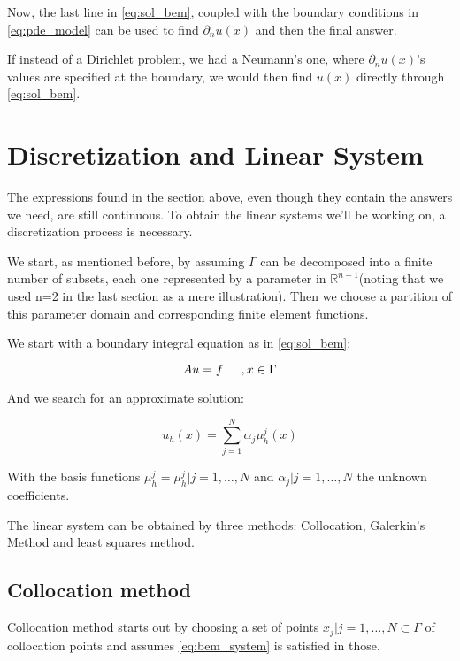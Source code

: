 Now, the last line in \ref{eq:sol_bem}, coupled with the boundary conditions in \ref{eq:pde_model} can be used to find $\partial_{n}u(x)$ and then the final answer.

If instead of a Dirichlet problem, we had a Neumann's one, where $\partial_{n}u(x)$'s values are specified at the boundary, we would then find $u(x)$ directly through \ref{eq:sol_bem}.

\section{Discretization and Linear System}

The expressions found in the section above, even though they contain the answers we need, are still continuous. To obtain the linear systems we'll be working on, a discretization process is necessary.

We start, as mentioned before, by assuming $\Gamma$ can be decomposed into a finite number of subsets, each one represented by a parameter in $\mathbb{R}^{n-1}$(noting that we used n=2 in the last section as a mere illustration). Then we choose a partition of this parameter domain and corresponding finite element functions.

We start with a boundary integral equation as in \ref{eq:sol_bem}:

\begin{equation}\label{eq:bem_system}
    Au = f \hspace{0.2in}, x \in \Gamma
\end{equation}

And we search for an approximate solution:

\begin{equation}\label{eq:approx_sol}
    u_{h}(x) = \sum_{j=1}^{N}\alpha_{j} \mu_{h}^{j}(x)
\end{equation}

With the basis functions $\mu_{h}^{j}={\mu_{h}^{j}|j=1, \dots, N}$ and ${\alpha_{j}|j=1, \dots, N}$ the unknown coefficients.

The linear system can be obtained by three methods: Collocation, Galerkin's Method and least squares method.

\subsection{Collocation method}

Collocation method starts out by choosing a set of points ${x_{j}|j=1, \dots, N} \subset \Gamma$ of collocation points and assumes \ref{eq:bem_system} is satisfied in those.

